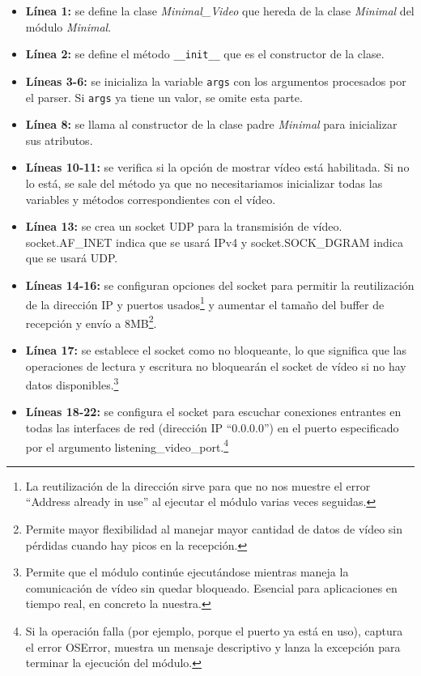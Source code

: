 \begin{itemize}
    \item \textbf{Línea 1:} se define la clase \textit{Minimal\_Video} que hereda de la clase \textit{Minimal} del módulo \textit{Minimal}.
    \item \textbf{Línea 2:} se define el método \texttt{\_\_init\_\_} que es el constructor de la clase.
    \item \textbf{Líneas 3-6:} se inicializa la variable \texttt{args} con los argumentos procesados por el parser. Si \texttt{args} ya tiene un valor, se omite esta parte.
    \item \textbf{Línea 8:} se llama al constructor de la clase padre \textit{Minimal} para inicializar sus atributos.
    \item \textbf{Líneas 10-11:} se verifica si la opción de mostrar vídeo está habilitada. Si no lo está, se sale del método ya que no necesitariamos inicializar todas las variables y métodos correspondientes con el vídeo.
    \item \textbf{Línea 13:} se crea un socket UDP para la transmisión de vídeo. socket.AF\_INET indica que se usará IPv4 y socket.SOCK\_DGRAM indica que se usará UDP.
    \item \textbf{Líneas 14-16:} se configuran opciones del socket para permitir la reutilización de la dirección IP y puertos usados\footnote{La reutilización de la dirección sirve para que no nos muestre el error ``Address already in use'' al ejecutar el módulo varias veces seguidas.} y aumentar el tamaño del buffer de recepción y envío a 8MB\footnote{Permite mayor flexibilidad al manejar mayor cantidad de datos de vídeo sin pérdidas cuando hay picos en la recepción.}.
    \item \textbf{Línea 17:} se establece el socket como no bloqueante, lo que significa que las operaciones de lectura y escritura no bloquearán el socket de vídeo si no hay datos disponibles.\footnote{Permite que el módulo continúe ejecutándose mientras maneja la comunicación de vídeo sin quedar bloqueado. Esencial para aplicaciones en tiempo real, en concreto la nuestra.}
    \item \textbf{Líneas 18-22:} se configura el socket para escuchar conexiones entrantes en todas las interfaces de red (dirección IP ``0.0.0.0'') en el puerto especificado por el argumento listening\_video\_port.\footnote{ Si la operación falla (por ejemplo, porque el puerto ya está en uso), captura el error OSError, muestra un mensaje descriptivo y lanza la excepción para terminar la ejecución del módulo.}

\end{itemize}
